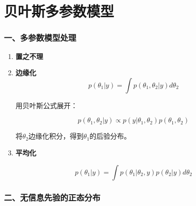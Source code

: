 \section{贝叶斯多参数模型}
\subsubsection{一、多参数模型处理}

\begin{enumerate}
\def\labelenumi{\arabic{enumi}.}
\item
  \textbf{置之不理}
\item
  \textbf{边缘化}
\begin{equation}
  p(\theta_1|y)=\int p(\theta_1,\theta_2|y)d\theta_2
\end{equation}
  
  用贝叶斯公式展开：

  \[p(\theta_1,\theta_2|y)\propto p(y|\theta_1,\theta_2)p(\theta_1,\theta_2)\]

  将\(\theta_2\)边缘化积分，得到\(\theta_1\)的后验分布。
\item
  \textbf{平均化}

  \[p(\theta_1|y)=\int p(\theta_1|\theta_2,y)p(\theta_2|y)d\theta_2\]
\end{enumerate}

\hypertarget{ux4e8cux65e0ux4fe1ux606fux5148ux9a8cux7684ux6b63ux6001ux5206ux5e03}{%
\subsubsection{二、无信息先验的正态分布}\label{ux4e8cux65e0ux4fe1ux606fux5148ux9a8cux7684ux6b63ux6001ux5206ux5e03}}


